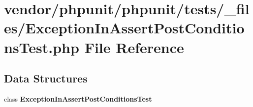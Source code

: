 \section{vendor/phpunit/phpunit/tests/\+\_\+files/\+Exception\+In\+Assert\+Post\+Conditions\+Test.php File Reference}
\label{_exception_in_assert_post_conditions_test_8php}
\subsection*{Data Structures}
\begin{DoxyCompactItemize}
\item 
class {\bf Exception\+In\+Assert\+Post\+Conditions\+Test}
\end{DoxyCompactItemize}
